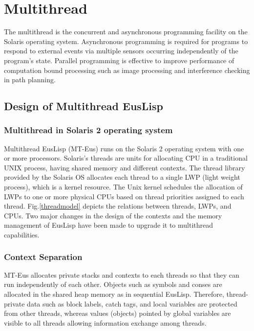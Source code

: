 \newpage
\section{Multithread\label{mthread}}

The multithread is the concurrent and asynchronous programming facility
on the Solaris operating system. 
Asynchronous programming is required for programs to respond to
external events via multiple sensors occurring independently of
the program's state.
Parallel programming is effective to improve performance of
computation bound processing such as image processing and interference
checking in path planning.

\subsection{Design of Multithread EusLisp}
\subsubsection{ Multithread in Solaris 2 operating system}
Multithread EusLisp (MT-Eus) runs on the Solaris 2 operating system
with one or more processors.  Solaris's threads are units for allocating
CPU in a traditional UNIX process, having shared memory and different
contexts. %
The thread library provided by the Solaris OS allocates each
thread to a single LWP (light weight process), which is a kernel
resource.
The Unix kernel schedules the allocation of  LWPs to one or more
physical CPUs based on thread priorities assigned to each thread. 
Fig.\ref{threadmodel} depicts the relations between threads, LWPs, and CPUs.
Two major changes in the design of the contexts and the memory management
of EusLisp have been made to upgrade it to multithread capabilities.

\subsubsection{Context Separation}
MT-Eus allocates private stacks and contexts  to each threads
so that they can run independently of each other. Objects
such as symbols and conses are allocated in the shared heap
memory as in sequential EusLisp.
Therefore, thread-private data such as block labels,
catch tags, and local variables 
are protected from other threads, whereas  values (objects) 
pointed by global variables are visible to all threads allowing
information exchange among threads.


